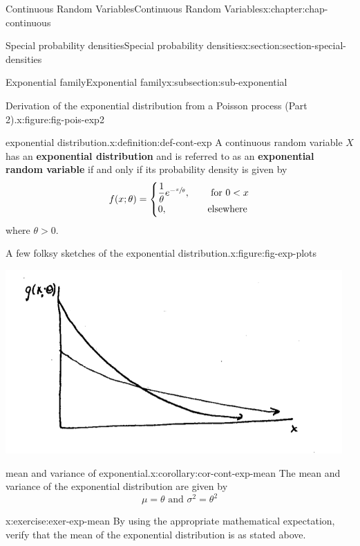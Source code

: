 \documentclass[oneside,10pt,]{book}
\newcommand{\terminology}[1]{\textbf{#1}}
\newcommand{\lt}{<}
\newcommand{\gt}{>}
\newcommand{\amp}{&}
\begin{document}
\begin{chapterptx}{Continuous Random Variables}{}{Continuous Random Variables}{}{}{x:chapter:chap-continuous}
\begin{sectionptx}{Special probability densities}{}{Special probability densities}{}{}{x:section:section-special-densities}
\begin{subsectionptx}{Exponential family}{}{Exponential family}{}{}{x:subsection:sub-exponential}
\begin{figureptx}{Derivation of the exponential distribution from a Poisson process (Part 2).}{x:figure:fig-pois-exp2}{}
\begin{image}{0.1}{0.8}{0.1}
\end{image}%
\tcblower
\end{figureptx}%
\begin{definition}{exponential distribution.}{x:definition:def-cont-exp}%
A continuous random variable \(\displaystyle X\) has an \terminology{exponential distribution} and is referred to as an \terminology{exponential random variable} if and only if its probability density is given by%
\begin{equation*}
f(x; \theta) =
\begin{cases}\dfrac{1}{\theta}e^{-\sfrac{x}{\theta}}, \amp \quad \text{
for } 0 \lt x\\0, \amp \quad \text{elsewhere}\end{cases}
\end{equation*}
where \(\theta \gt 0\).%
\end{definition}
\begin{figureptx}{A few folksy sketches of the exponential distribution.}{x:figure:fig-exp-plots}{}%
\begin{image}{0.25}{0.5}{0.25}%
\includegraphics[width=\linewidth]{./images/exps.png}
\end{image}%
\tcblower
\end{figureptx}%
\begin{corollary}{mean and variance of exponential.}{}{x:corollary:cor-cont-exp-mean}%
The mean and variance of the exponential distribution are given by%
\begin{equation*}
\mu = \theta \text{ and }\sigma^2 = \theta^2
\end{equation*}
%
\end{corollary}
\begin{inlineexercise}{}{x:exercise:exer-exp-mean}%
By using the appropriate mathematical expectation, verify that the mean of the exponential distribution is as stated above.%

\end{inlineexercise}
\end{subsectionptx}
\end{sectionptx}
\end{chapterptx}
\end{document}
